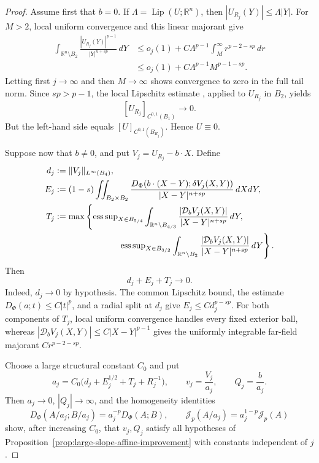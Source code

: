 \documentclass[11pt,reqno]{amsart}
\numberwithin{equation}{section}
\newcommand{\R}{\mathbb R}
\newcommand{\Jp}{\mathcal J_p}
\newcommand{\dd}{\,d}
\newcommand{\Lip}{\operatorname{Lip}}
\theoremstyle{remark}
\begin{document}
\begin{proof}
Assume first that \(b=0\).  If
\(\Lambda=\Lip(U;\R^n)\), then \(|U_{R_j}(Y)|\le\Lambda|Y|\).  For
\(M>2\), local uniform convergence and this linear majorant give
\begin{align*}
 \int_{\R^n\setminus B_2}
 \frac{|U_{R_j}(Y)|^{p-1}}{|Y|^{n+sp}}\dd Y
 &\le o_j(1)
 +C\Lambda^{p-1}\int_M^\infty r^{p-2-sp}\dd r\\
 &\le o_j(1)+C\Lambda^{p-1}M^{p-1-sp}.
\end{align*}
Letting first \(j\to\infty\) and then \(M\to\infty\) shows convergence
to zero in the full tail norm.  Since $sp>p-1$, the local Lipschitz
estimate \cite[Theorem~2.1]{BiswasTopp}, applied to \(U_{R_j}\) in
\(B_2\), yields
\[
 [U_{R_j}]_{C^{0,1}(B_1)}\longrightarrow0.
\]
But the left-hand side equals
\([U]_{C^{0,1}(B_{R_j})}\).  Hence \(U\equiv0\).

Suppose now that \(b\ne0\), and put \(V_j=U_{R_j}-b\cdot X\).  Define
\begin{align*}
 d_j&:=\|V_j\|_{L^\infty(B_4)},\\
 E_j&:=(1-s)\iint_{B_2\times B_2}
 \frac{D_\Phi(b\cdot(X-Y);\delta V_j(X,Y))}
 {|X-Y|^{n+sp}}\dd X\!\dd Y,\\
 T_j&:=\max\left\{
 {\operatorname*{ess\,sup}}_{X\in B_{5/4}}
 \int_{\R^n\setminus B_{4/3}}
 \frac{|\mathcal D_bV_j(X,Y)|}{|X-Y|^{n+sp}}\dd Y,\right.\\
 &\hspace{26mm}\left.
 {\operatorname*{ess\,sup}}_{X\in B_{3/2}}
 \int_{\R^n\setminus B_2}
 \frac{|\mathcal D_bV_j(X,Y)|}{|X-Y|^{n+sp}}\dd Y\right\}.
\end{align*}
Then
\begin{equation*}
 d_j+E_j+T_j\longrightarrow0.
\end{equation*}
Indeed, \(d_j\to0\) by hypothesis.  The common Lipschitz bound, the
estimate \(D_\Phi(a;t)\le C|t|^p\), and a radial split at \(d_j\) give
\(E_j\le Cd_j^{p-sp}\).  For both components of \(T_j\), local uniform
convergence handles every fixed exterior ball, whereas
\(|\mathcal D_bV_j(X,Y)|\le C|X-Y|^{p-1}\) gives the uniformly integrable
far-field majorant \(Cr^{p-2-sp}\).

Choose a large structural constant \(C_0\) and put
\[
 a_j=C_0\bigl(d_j+E_j^{1/2}+T_j+R_j^{-1}\bigr),\qquad
 v_j=\frac{V_j}{a_j},\qquad Q_j=\frac b{a_j}.
\]
Then \(a_j\to0\), \(|Q_j|\to\infty\), and the homogeneity identities
\[
 D_\Phi(A/a_j;B/a_j)=a_j^{-p}D_\Phi(A;B),\qquad
 \Jp(A/a_j)=a_j^{1-p}\Jp(A)
\]
show, after increasing \(C_0\), that \(v_j,Q_j\) satisfy all hypotheses
of Proposition~\ref{prop:large-slope-affine-improvement} with constants
independent of \(j\).


\end{proof}
\end{document}
